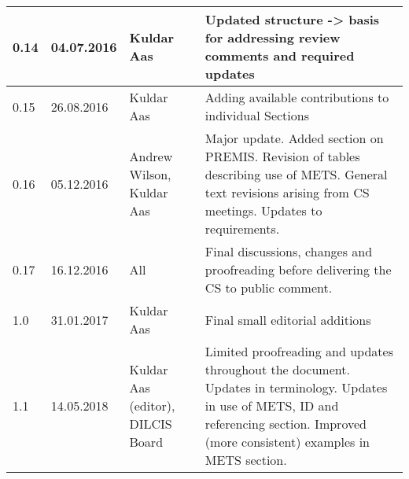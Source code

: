 \begin{tabular}{|p{}|p{}|p{4cm}|p{7cm}|}
\hline
0.14   & 04.07.2016 & Kuldar Aas                  & Updated structure -> basis for addressing review comments and required updates \\
\hline
0.15   & 26.08.2016 & Kuldar Aas                  & Adding available contributions to individual Sections \\
\hline
0.16   & 05.12.2016 & Andrew Wilson, Kuldar Aas   & Major update. Added section on PREMIS. Revision of tables describing use of METS. General text revisions arising from CS meetings. Updates to requirements. \\
\hline
0.17   & 16.12.2016        & All                  & Final discussions, changes and proofreading before delivering the CS to public comment. \\
\hline
1.0   & 31.01.2017        & Kuldar Aas            & Final small editorial additions \\
\hline
1.1   & 14.05.2018        & Kuldar Aas (editor), DILCIS Board & Limited proofreading and updates throughout the document. Updates in terminology. Updates in use of METS, ID and referencing section. Improved (more consistent) examples in METS section. \\
\hline
\end{tabular}

\pagebreak
